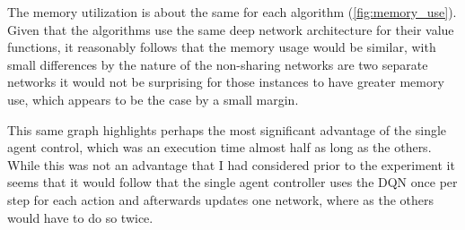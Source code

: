 \documentclass[12pt,letterpaper]{exam}
\begin{document}
\begin{questions}
The memory utilization is about the same for each algorithm 
(\cref{fig:memory_use}). Given that the algorithms use the same deep network 
architecture for their value functions, it reasonably follows that the memory 
usage would be similar, with small differences by the nature of the non-sharing 
networks are two separate networks it would not be surprising for those 
instances to have greater memory use, which appears to be the case by a
small margin.

This same graph highlights perhaps the most significant advantage of 
the single agent control, which was an execution time almost half
as long as the others. While this was not an advantage that I had 
considered prior to the experiment it seems that it would follow
that the single agent controller uses the DQN once per step for each 
action and afterwards updates one network, where as the others would 
have to do so twice.

\end{questions}














\clearpage
\end{document}
